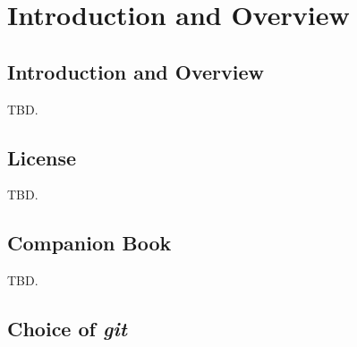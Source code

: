 \chapter{Introduction and Overview}

\label{ciov0}

\section{Introduction and Overview}
\label{ciov2:siov0}

TBD.

\section{License}
\label{ciov2:slic0}

TBD.

\section{Companion Book}
\label{ciov2:scbk0}

TBD.

\section{Choice of \emph{git}}
\label{ciov2:scgt0}

